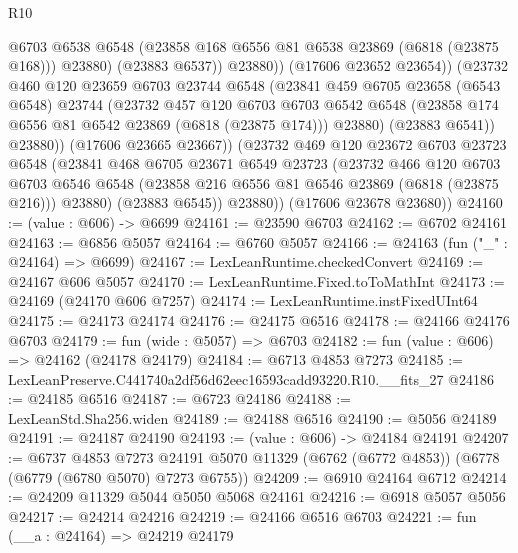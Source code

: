 \begin{lexlean}{R10}
\begin{coremodule}
                      @6703
                      @6538
                      @6548
                      (@23858 @168 @6556 @81 @6538 @23869 (@6818 (@23875 @168)))
                      @23880)
                    (@23883 @6537))
                  @23880))
              (@17606 @23652 @23654))
            (@23732
              @460
              @120
              @23659
              @6703
              @23744
              @6548
              (@23841
                @459
                @6705
                @23658
                (@6543 @6548)
                @23744
                (@23732
                  @457
                  @120
                  @6703
                  @6703
                  @6542
                  @6548
                  (@23858 @174 @6556 @81 @6542 @23869 (@6818 (@23875 @174)))
                  @23880)
                (@23883 @6541))
              @23880))
          (@17606 @23665 @23667))
        (@23732
          @469
          @120
          @23672
          @6703
          @23723
          @6548
          (@23841
            @468
            @6705
            @23671
            @6549
            @23723
            (@23732
              @466
              @120
              @6703
              @6703
              @6546
              @6548
              (@23858 @216 @6556 @81 @6546 @23869 (@6818 (@23875 @216)))
              @23880)
            (@23883 @6545))
          @23880))
      (@17606 @23678 @23680))
@24160 := (value : @606) -> @6699
@24161 := @23590 @6703
@24162 := @6702 @24161
@24163 := @6856 @5057
@24164 := @6760 @5057
@24166 := @24163 (fun ("_" : @24164) => @6699)
@24167 := LexLeanRuntime.checkedConvert
@24169 := @24167 @606 @5057
@24170 := LexLeanRuntime.Fixed.toToMathInt
@24173 := @24169 (@24170 @606 @7257)
@24174 := LexLeanRuntime.instFixedUInt64
@24175 := @24173 @24174
@24176 := @24175 @6516
@24178 := @24166 @24176 @6703
@24179 := fun (wide : @5057) => @6703
@24182 := fun (value : @606) => @24162 (@24178 @24179)
@24184 := @6713 @4853 @7273
@24185 := LexLeanPreserve.C441740a2df56d62eec16593cadd93220.R10.__fits_27
@24186 := @24185 @6516
@24187 := @6723 @24186
@24188 := LexLeanStd.Sha256.widen
@24189 := @24188 @6516
@24190 := @5056 @24189
@24191 := @24187 @24190
@24193 := (value : @606) -> @24184 @24191
@24207 := @6737
    @4853
    @7273
    @24191
    @5070
    @11329
    (@6762 (@6772 @4853))
    (@6778 (@6779 (@6780 @5070) @7273 @6755))
@24209 := @6910 @24164 @6712
@24214 := @24209 @11329 @5044 @5050 @5068 @24161
@24216 := @6918 @5057 @5056
@24217 := @24214 @24216
@24219 := @24166 @6516 @6703
@24221 := fun (__a : @24164) => @24219 @24179

\end{coremodule}
\end{lexlean}
